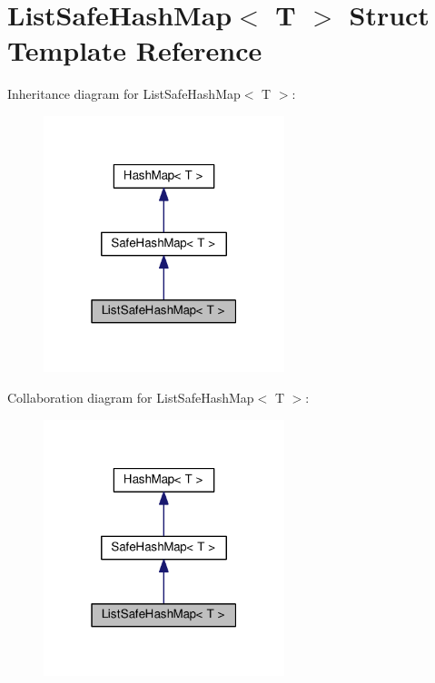 \hypertarget{structListSafeHashMap}{}\section{List\+Safe\+Hash\+Map$<$ T $>$ Struct Template Reference}
\label{structListSafeHashMap}


Inheritance diagram for List\+Safe\+Hash\+Map$<$ T $>$\+:\nopagebreak
\begin{figure}[H]
\begin{center}
\leavevmode
\includegraphics[width=199pt]{structListSafeHashMap__inherit__graph}
\end{center}
\end{figure}


Collaboration diagram for List\+Safe\+Hash\+Map$<$ T $>$\+:\nopagebreak
\begin{figure}[H]
\begin{center}
\leavevmode
\includegraphics[width=199pt]{structListSafeHashMap__coll__graph}
\end{center}
\end{figure}

